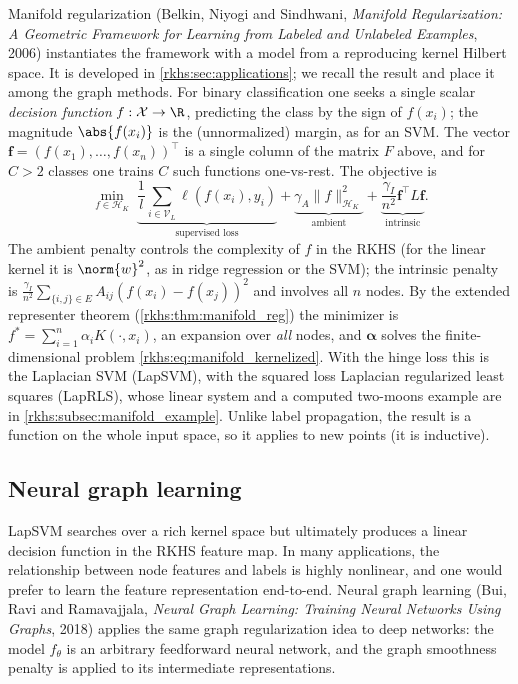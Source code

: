 \begin{notechapter}
Manifold regularization (Belkin, Niyogi and Sindhwani, \emph{Manifold Regularization: A Geometric Framework for Learning from Labeled and Unlabeled Examples}, 2006) instantiates the framework with a model from a reproducing kernel Hilbert space. It is developed in \cref{rkhs:sec:applications}; we recall the result and place it among the graph methods. For binary classification one seeks a single scalar \emph{decision function} $f: \mathcal X \to \R$, predicting the class by the sign of $f(x_i)$; the magnitude $\abs{f(x_i)}$ is the (unnormalized) margin, as for an SVM. The vector $\mathbf f = (f(x_1), \ldots, f(x_n))^\top$ is a single column of the matrix $F$ above, and for $C > 2$ classes one trains $C$ such functions one-vs-rest. The objective is
\begin{equation}
\label{semi-supervised-graphs:eq:manifold_reg}
\min_{f \in \mathcal{H}_K}\;
\underbrace{\frac{1}{l}\sum_{i \in \mathcal{V}_L}\ell(f(x_i), y_i)}_{\text{supervised loss}}
+ \underbrace{\gamma_A\|f\|_{\mathcal{H}_K}^2}_{\text{ambient}}
+ \underbrace{\frac{\gamma_I}{n^2}\mathbf{f}^\top L\mathbf{f}}_{\text{intrinsic}} .
\end{equation}
The ambient penalty controls the complexity of $f$ in the RKHS (for the linear kernel it is $\norm{w}^2$, as in ridge regression or the SVM); the intrinsic penalty is $\frac{\gamma_I}{n^2}\sum_{\{i,j\}\in E}A_{ij}(f(x_i) - f(x_j))^2$ and involves all $n$ nodes. By the extended representer theorem (\cref{rkhs:thm:manifold_reg}) the minimizer is $f^* = \sum_{i=1}^n\alpha_iK(\cdot, x_i)$, an expansion over \emph{all} nodes, and $\boldsymbol\alpha$ solves the finite-dimensional problem \eqref{rkhs:eq:manifold_kernelized}. With the hinge loss this is the Laplacian SVM (LapSVM), with the squared loss Laplacian regularized least squares (LapRLS), whose linear system and a computed two-moons example are in \cref{rkhs:subsec:manifold_example}. Unlike label propagation, the result is a function on the whole input space, so it applies to new points (it is inductive).

\subsection{Neural graph learning}
\label{semi-supervised-graphs:subsec:neural_graph}

LapSVM searches over a rich kernel space but ultimately produces a linear
decision function in the RKHS feature map. In many applications, the
relationship between node features and labels is highly nonlinear, and one
would prefer to learn the feature representation end-to-end. Neural graph
learning (Bui, Ravi and Ramavajjala, \emph{Neural Graph Learning: Training Neural Networks Using Graphs}, 2018) applies the same graph regularization idea to deep
networks: the model $f_\theta$ is an arbitrary feedforward neural network, and
the graph smoothness penalty is applied to its intermediate representations.


\end{notechapter}
